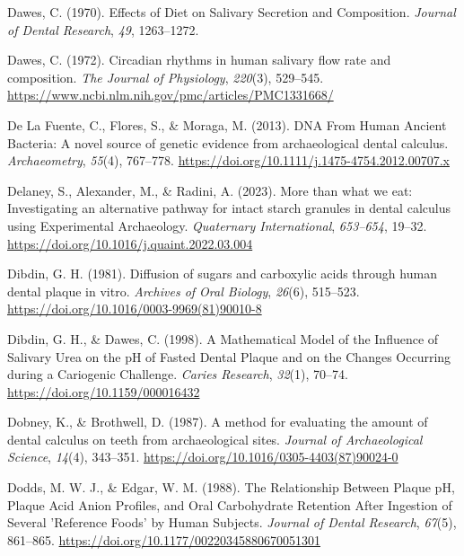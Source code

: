 \documentclass[
  letterpaper,
]{book}
\newlength{\cslhangindent}
\newlength{\cslentryspacingunit} %
\newenvironment{CSLReferences}[2] %
 {%
  \setlength{\parindent}{0pt}
  \ifodd #1
  \let\oldpar\par
  \def\par{\hangindent=\cslhangindent\oldpar}
  \fi
  \setlength{\parskip}{#2\cslentryspacingunit}
 }%
 {}
\begin{document}
\begin{CSLReferences}{1}{0}
\leavevmode{}%
Dawes, C. (1970). Effects of {Diet} on {Salivary Secretion} and
{Composition}. \emph{Journal of Dental Research}, \emph{49}, 1263--1272.

\leavevmode{}%
Dawes, C. (1972). Circadian rhythms in human salivary flow rate and
composition. \emph{The Journal of Physiology}, \emph{220}(3), 529--545.
\url{https://www.ncbi.nlm.nih.gov/pmc/articles/PMC1331668/}

\leavevmode{}%
De La Fuente, C., Flores, S., \& Moraga, M. (2013). {DNA From Human
Ancient Bacteria}: {A} novel source of genetic evidence from
archaeological dental calculus. \emph{Archaeometry}, \emph{55}(4),
767--778. \url{https://doi.org/10.1111/j.1475-4754.2012.00707.x}

\leavevmode{}%
Delaney, S., Alexander, M., \& Radini, A. (2023). More than what we eat:
{Investigating} an alternative pathway for intact starch granules in
dental calculus using {Experimental Archaeology}. \emph{Quaternary
International}, \emph{653--654}, 19--32.
\url{https://doi.org/10.1016/j.quaint.2022.03.004}

\leavevmode{}%
Dibdin, G. H. (1981). Diffusion of sugars and carboxylic acids through
human dental plaque in vitro. \emph{Archives of Oral Biology},
\emph{26}(6), 515--523.
\url{https://doi.org/10.1016/0003-9969(81)90010-8}

\leavevmode{}%
Dibdin, G. H., \& Dawes, C. (1998). A {Mathematical Model} of the
{Influence} of {Salivary Urea} on the {pH} of {Fasted Dental Plaque} and
on the {Changes Occurring} during a {Cariogenic Challenge}. \emph{Caries
Research}, \emph{32}(1), 70--74. \url{https://doi.org/10.1159/000016432}

\leavevmode{}%
Dobney, K., \& Brothwell, D. (1987). A method for evaluating the amount
of dental calculus on teeth from archaeological sites. \emph{Journal of
Archaeological Science}, \emph{14}(4), 343--351.
\url{https://doi.org/10.1016/0305-4403(87)90024-0}

\leavevmode{}%
Dodds, M. W. J., \& Edgar, W. M. (1988). The {Relationship Between
Plaque pH}, {Plaque Acid Anion Profiles}, and {Oral Carbohydrate
Retention After Ingestion} of {Several} '{Reference Foods}' by {Human
Subjects}. \emph{Journal of Dental Research}, \emph{67}(5), 861--865.
\url{https://doi.org/10.1177/00220345880670051301}


\end{CSLReferences}
\end{document}
